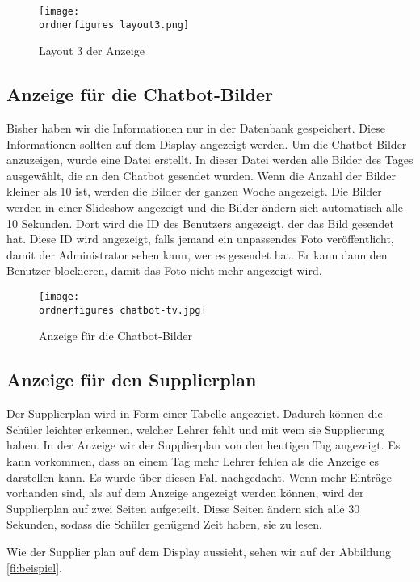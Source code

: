 \begin{figure}[H]
	\centering
	\texttt{[image: \\ordnerfigures layout3.png]}
	\caption{Layout 3 der Anzeige}
	\label{fi:layout3}
\end{figure}

\subsection{Anzeige für die Chatbot-Bilder}

Bisher haben wir die Informationen nur in der Datenbank gespeichert. Diese Informationen sollten auf dem Display angezeigt werden. Um die Chatbot-Bilder anzuzeigen, wurde eine Datei erstellt. In dieser Datei werden alle Bilder des Tages ausgewählt, die an den Chatbot gesendet wurden. Wenn die Anzahl der Bilder kleiner als 10 ist, werden die Bilder der ganzen Woche angezeigt. Die Bilder werden in einer Slideshow angezeigt und die Bilder ändern sich automatisch alle 10 Sekunden.
Dort wird die ID des Benutzers angezeigt, der das Bild gesendet hat. Diese ID wird angezeigt, falls jemand ein unpassendes Foto veröffentlicht, damit der Administrator sehen kann, wer es gesendet hat. Er kann dann den Benutzer blockieren, damit das Foto nicht mehr angezeigt wird.

\begin{figure}[H]
	\centering
	\texttt{[image: \\ordnerfigures chatbot-tv.jpg]}
	\caption{Anzeige für die Chatbot-Bilder}
	\label{fi:chatbot}
\end{figure}

\subsection{Anzeige für den Supplierplan}

Der Supplierplan wird in Form einer Tabelle angezeigt. Dadurch können die Schüler leichter erkennen, welcher Lehrer fehlt und mit wem sie Supplierung haben. In der Anzeige wir der Supplierplan von den heutigen Tag angezeigt. Es kann vorkommen, dass an einem Tag mehr Lehrer fehlen als die Anzeige es darstellen kann. Es wurde über diesen Fall nachgedacht. Wenn mehr Einträge vorhanden sind, als auf dem Anzeige angezeigt werden  können, wird der Supplierplan auf zwei Seiten aufgeteilt. Diese Seiten ändern sich alle 30 Sekunden, sodass die Schüler genügend Zeit haben, sie zu lesen.

Wie der Supplier plan auf dem Display aussieht, sehen wir auf der Abbildung \ref{fi:beispiel}.

